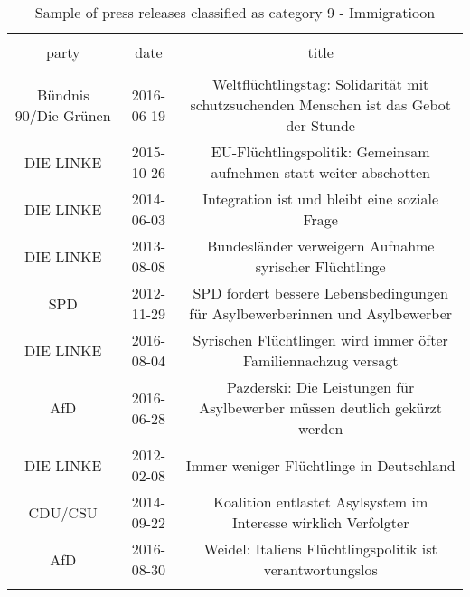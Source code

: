 
\begin{table}[!htbp] \centering 
  \caption{Sample of press releases classified as category 9 - Immigratioon} 
  \label{tab:7-document-samples} 
\begin{tabular}{@{\extracolsep{5pt}} ccc} 
\\[-1.8ex]\hline 
\hline \\[-1.8ex] 
party & date & title \\ 
\hline \\[-1.8ex] 
Bündnis 90/Die Grünen & 2016-06-19 & Weltflüchtlingstag: Solidarität mit schutzsuchenden Menschen ist das Gebot der Stunde \\ 
DIE LINKE & 2015-10-26 & EU-Flüchtlingspolitik: Gemeinsam aufnehmen statt weiter abschotten \\ 
DIE LINKE & 2014-06-03 & Integration ist und bleibt eine soziale Frage  \\ 
DIE LINKE & 2013-08-08 & Bundesländer verweigern Aufnahme syrischer Flüchtlinge \\ 
SPD & 2012-11-29 & SPD fordert bessere Lebensbedingungen für Asylbewerberinnen und Asylbewerber \\ 
DIE LINKE & 2016-08-04 & Syrischen Flüchtlingen wird immer öfter Familiennachzug versagt \\ 
AfD & 2016-06-28 & Pazderski: Die Leistungen für Asylbewerber müssen deutlich gekürzt werden \\ 
DIE LINKE & 2012-02-08 & Immer weniger Flüchtlinge in Deutschland \\ 
CDU/CSU & 2014-09-22 & Koalition entlastet Asylsystem im Interesse wirklich Verfolgter \\ 
AfD & 2016-08-30 & Weidel: Italiens Flüchtlingspolitik ist verantwortungslos \\ 
\hline \\[-1.8ex] 
\end{tabular} 
\end{table} 
